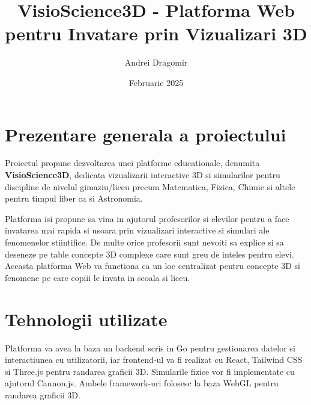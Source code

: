 \documentclass[a4paper,12pt]{article}
\title{VisioScience3D - Platforma Web pentru Invatare prin Vizualizari 3D}
\author{Andrei Dragomir}
\date{Februarie 2025}
\begin{document}
\maketitle

\section*{Prezentare generala a proiectului}
Proiectul propune dezvoltarea unei platforme educationale, denumita \textbf{VisioScience3D}, 
dedicata vizualizarii interactive 3D si simularilor pentru discipline de nivelul gimaziu/liceu
precum Matematica, Fizica, Chimie si altele pentru timpul liber ca si Astronomia.

Platforma isi propune sa vina in ajutorul profesorilor si elevilor pentru a face invatarea mai 
rapida si usoara prin vizualizari interactive si simulari ale fenomenelor stiintifice. De multe orice
profesorii sunt nevoiti sa explice si sa deseneze pe table concepte 3D complexe care sunt greu de
inteles pentru elevi. Aceasta platforma Web va functiona ca un loc centralizat pentru concepte 
3D si fenomene pe care copiii le invata in scoala si liceu.

\section*{Tehnologii utilizate}

Platforma va avea la baza un backend scris in Go pentru gestionarea datelor si interactiunea cu
utilizatorii, iar frontend-ul va fi realizat cu React, Tailwind CSS si Three.js pentru randarea graficii 3D.
Simularile fizice vor fi implementate cu ajutorul Cannon.js. Ambele framework-uri folosesc la 
baza WebGL pentru randarea graficii 3D.
\end{document}
